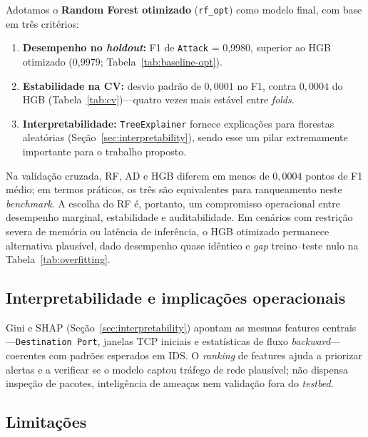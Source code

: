 \documentclass[12pt]{article}
\makeatletter
\newlength{\sbcblockmargin}
\newenvironment{sbcnarrowblock}{%
  \list{}{%
    \topsep\z@
    \partopsep\z@
    \itemsep\z@
    \parsep\z@
    \leftmargin=\sbcblockmargin
    \rightmargin=\sbcblockmargin
    \listparindent=\parindent
    \itemindent=\z@
    \labelwidth=\z@
    \labelsep=\z@
  }\item\relax}
{\endlist}
\makeatother
\begin{document}
\begin{sbcnarrowblock}
Adotamos o \textbf{Random Forest otimizado} (\texttt{rf\_opt}) como modelo final, com base em três critérios:
\begin{enumerate}
  \item \textbf{Desempenho no \textit{holdout}:} F1 de \texttt{Attack} = 0,9980, superior ao HGB otimizado (0,9979; Tabela~\ref{tab:baseline-opt}).
  \item \textbf{Estabilidade na CV:} desvio padrão de $0{,}0001$ no F1, contra $0{,}0004$ do HGB (Tabela~\ref{tab:cv})---quatro vezes mais estável entre \textit{folds}.
  \item \textbf{Interpretabilidade:} \texttt{TreeExplainer} fornece explicações para florestas aleatórias (Seção~\ref{sec:interpretability}), sendo esse um pilar extremamente importante para o trabalho proposto.
\end{enumerate}
Na validação cruzada, RF, AD e HGB diferem em menos de $0{,}0004$ pontos de F1 médio; em termos práticos, os três são equivalentes para ranqueamento neste \textit{benchmark}.
A escolha do RF é, portanto, um compromisso operacional entre desempenho marginal, estabilidade e auditabilidade.
Em cenários com restrição severa de memória ou latência de inferência, o HGB otimizado permanece alternativa plausível, dado desempenho quase idêntico e \textit{gap} treino--teste nulo na Tabela~\ref{tab:overfitting}.

\subsection{Interpretabilidade e implicações operacionais}
\label{sec:disc-interpretability}

Gini e SHAP (Seção~\ref{sec:interpretability}) apontam as mesmas features centrais---\texttt{Destination Port}, janelas TCP iniciais e estatísticas de fluxo \textit{backward}---coerentes com padrões esperados em IDS.
O \textit{ranking} de features ajuda a priorizar alertas e a verificar se o modelo captou tráfego de rede plausível; não dispensa inspeção de pacotes, inteligência de ameaças nem validação fora do \textit{testbed}.

\subsection{Limitações}
\label{sec:disc-limitations}


\end{sbcnarrowblock}
\end{document}
